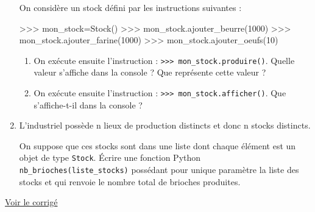 \documentclass[
  letterpaper,
  DIV=11,
  numbers=noendperiod]{scrartcl}
\newenvironment{Shaded}{\begin{snugshade}}{\end{snugshade}}
\newcommand{\DecValTok}[1]{\textcolor[rgb]{0.68,0.00,0.00}{#1}}
\newcommand{\NormalTok}[1]{\textcolor[rgb]{0.00,0.23,0.31}{#1}}
\newcommand{\OperatorTok}[1]{\textcolor[rgb]{0.37,0.37,0.37}{#1}}
\providecommand{\tightlist}{%
  \setlength{\itemsep}{0pt}\setlength{\parskip}{0pt}}\usepackage{longtable,booktabs,array}
\begin{document}
\begin{enumerate}
  On considère un stock défini par les instructions suivantes :

\begin{Shaded}
\begin{Highlighting}[]
\OperatorTok{\textgreater{}\textgreater{}\textgreater{}}\NormalTok{ mon\_stock}\OperatorTok{=}\NormalTok{Stock()}
\OperatorTok{\textgreater{}\textgreater{}\textgreater{}}\NormalTok{ mon\_stock.ajouter\_beurre(}\DecValTok{1000}\NormalTok{) }
\OperatorTok{\textgreater{}\textgreater{}\textgreater{}}\NormalTok{ mon\_stock.ajouter\_farine(}\DecValTok{1000}\NormalTok{) }
\OperatorTok{\textgreater{}\textgreater{}\textgreater{}}\NormalTok{ mon\_stock.ajouter\_oeufs(}\DecValTok{10}\NormalTok{)}
\end{Highlighting}
\end{Shaded}

  \begin{enumerate}
  \def\labelenumii{\arabic{enumii}.}
  \tightlist
  \item
    On exécute ensuite l'instruction :
    \texttt{\textgreater{}\textgreater{}\textgreater{}\ mon\_stock.produire()}.
    Quelle valeur s'affiche dans la console ? Que représente cette
    valeur ?
  \item
    On exécute ensuite l'instruction :
    \texttt{\textgreater{}\textgreater{}\textgreater{}\ mon\_stock.afficher()}.
    Que s'affiche-t-il dans la console ?
  \end{enumerate}
\item
  L'industriel possède n lieux de production distincts et donc n stocks
  distincts.

  On suppose que ces stocks sont dans une liste dont chaque élément est
  un objet de type \texttt{Stock}. Écrire une fonction Python
  \texttt{nb\_brioches(liste\_stocks)} possédant pour unique paramètre
  la liste des stocks et qui renvoie le nombre total de brioches
  produites.
\end{enumerate}

\href{https://flallemand.fr/notebook/?from=https://flallemand.fr/nsi/assets/notebooks/exo4_POO_CORR.ipynb}{Voir
le corrigé}
\end{document}
